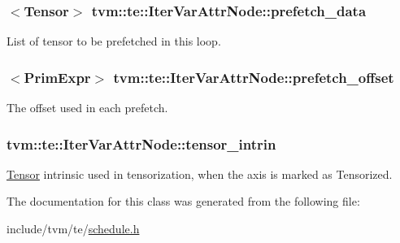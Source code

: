 \subsubsection[{\texorpdfstring{prefetch\+\_\+data}{prefetch_data}}]{$<${\bf Tensor}$>$ tvm\+::te\+::\+Iter\+Var\+Attr\+Node\+::prefetch\+\_\+data}\hypertarget{classtvm_1_1te_1_1IterVarAttrNode_a0cd129334ac1bc8d6461fb06be67e731}{}\label{classtvm_1_1te_1_1IterVarAttrNode_a0cd129334ac1bc8d6461fb06be67e731}


List of tensor to be prefetched in this loop. 

\subsubsection[{\texorpdfstring{prefetch\+\_\+offset}{prefetch_offset}}]{$<${\bf Prim\+Expr}$>$ tvm\+::te\+::\+Iter\+Var\+Attr\+Node\+::prefetch\+\_\+offset}\hypertarget{classtvm_1_1te_1_1IterVarAttrNode_a2a4a8e201e6caefeecffd4a7647866fd}{}\label{classtvm_1_1te_1_1IterVarAttrNode_a2a4a8e201e6caefeecffd4a7647866fd}


The offset used in each prefetch. 

\subsubsection[{\texorpdfstring{tensor\+\_\+intrin}{tensor_intrin}}]{ tvm\+::te\+::\+Iter\+Var\+Attr\+Node\+::tensor\+\_\+intrin}\hypertarget{classtvm_1_1te_1_1IterVarAttrNode_a6a0d96bbebfd716f851b2ad01738cb3f}{}\label{classtvm_1_1te_1_1IterVarAttrNode_a6a0d96bbebfd716f851b2ad01738cb3f}


\hyperlink{classtvm_1_1te_1_1Tensor}{Tensor} intrinsic used in tensorization, when the axis is marked as Tensorized. 



The documentation for this class was generated from the following file\+:\begin{DoxyCompactItemize}
\item 
include/tvm/te/\hyperlink{schedule_8h}{schedule.\+h}\end{DoxyCompactItemize}
